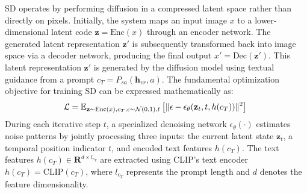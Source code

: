  SD operates by performing diffusion in a compressed latent space rather than directly on pixels. Initially, the system maps an input image $x$ to a lower-dimensional latent code $\mathbf{z}=\text{Enc}(x)$ through an encoder network.
The generated latent representation $\mathbf{z}'$ is subsequently transformed back into image space via a decoder network, producing the final output $x'=\text{Dec}(\mathbf{z}')$. This latent representation $\mathbf{z}'$ is generated by the diffusion model using textual guidance from a prompt $c_T=P_{sa}(\mathbf{h}_{vr},a)$.
The fundamental optimization objective for training SD can be expressed mathematically as: 
\vspace{-1mm}
\begin{gather}
    \hspace{-1mm}\mathcal{L}=\mathbb{E}_{\mathbf{z} \sim \text{Enc}(x), c_T, \epsilon \sim \mathcal{N}(0,1), t} \left[ \|\epsilon - \epsilon_\theta(\mathbf{z}_t, t, h(c_T))\|^2 \right]
\end{gather}
During each iterative step $t$, a specialized denoising network $\epsilon_\theta(\cdot)$ estimates noise patterns by jointly processing three inputs: the current latent state $\mathbf{z}_t$, a temporal position indicator $t$, and encoded text features $h(c_T)$. The text features $h(c_T)\in\mathbf{R}^{d\times l_{c_T}}$ are extracted using CLIP's text encoder \citep{radford2021learning} $h(c_T)=\text{CLIP}(c_T)$, where $l_{c_T}$ represents the prompt length and $d$ denotes the feature dimensionality.



